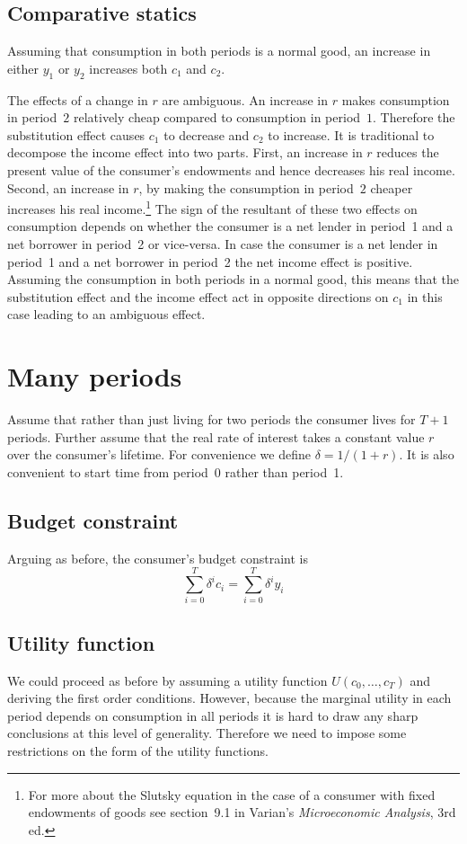 \documentclass[12pt,reqno,openany]{amsbook}
\theoremstyle{plain}
\theoremstyle{definition}
\begin{document}
\subsection{Comparative statics}
Assuming that consumption in both periods is a normal good, an
increase in either $y_1$ or $y_2$ increases both $c_1$ and $c_2$.

The effects of a change in $r$ are ambiguous. An increase in $r$ makes
consumption in period~$2$ relatively cheap compared to consumption in
period~$1$. Therefore the substitution effect causes $c_1$ to decrease
and $c_2$ to increase. It is traditional to decompose the income
effect into two parts. First, an increase in $r$ reduces the present
value of the consumer's endowments and hence decreases his real
income. Second, an increase in $r$, by making the consumption in
period~$2$ cheaper increases his real income.\footnote{
For more about the Slutsky equation in the case of a consumer with
fixed endowments of goods see section~9.1 in Varian's
\emph{Microeconomic Analysis}, 3rd ed.} The sign of the
resultant of these two effects on consumption depends on whether the
consumer is a net lender in period~1 and a net borrower in period~2 or
vice-versa. In case the consumer is a net lender in period~1 and a net
borrower in period~2 the net income effect is positive. Assuming the
consumption in both periods in a normal good, this means that the
substitution effect and the income effect act in opposite directions
on $c_1$ in this case leading to an ambiguous effect.

\section{Many periods}
Assume that rather than just living for two periods the consumer lives
for $T+1$ periods. Further assume that the real rate of interest takes a
constant value $r$ over the consumer's lifetime. For convenience we
define $\delta=1/(1+r)$. It is also convenient to start time from
period~0 rather than period~1.

\subsection{Budget constraint}
Arguing as before, the consumer's budget constraint is
\begin{equation}\label{eq:many-period-budget}
\sum_{i=0}^T \delta^i c_i = \sum_{i=0}^T \delta^i y_i
\end{equation}

\subsection{Utility function}
We could proceed as before by assuming a utility function
$U(c_0,\ldots,c_T)$ and deriving the first order conditions. However,
because the marginal utility in each period depends on consumption in
all periods it is hard to draw any sharp conclusions at this level of
generality. Therefore we need to impose some restrictions on the form
of the utility functions.
\end{document}
